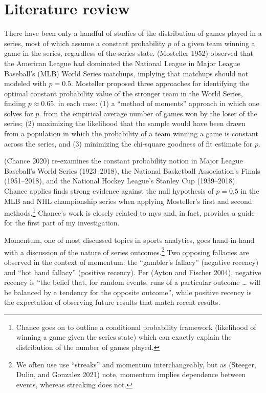 \documentclass{article}
\begin{document}
\hypertarget{literature-review}{%
\section{Literature review}\label{literature-review}}

There have been only a handful of studies of the distribution of games
played in a series, most of which assume a constant probability \(p\) of
a given team winning a game in the series, regardless of the series
state. (Mosteller 1952) observed that the American League had dominated
the National League in Major League Baseball's (MLB) World Series
matchups, implying that matchups should not modeled with \(p = 0.5\).
Mosteller proposed three approaches for identifying the optimal constant
probability value of the stronger team in the World Series, finding
\(p \approx 0.65\). in each case: (1) a ``method of moments'' approach
in which one solves for \(p\). from the empirical average number of
games won by the loser of the series; (2) maximizing the likelihood that
the sample would have been drawn from a population in which the
probability of a team winning a game is constant across the series, and
(3) minimizing the chi-square goodness of fit estimate for \(p\).

(Chance 2020) re-examines the constant probability notion in Major
League Baseball's World Series (1923--2018), the National Basketball
Association's Finals (1951--2018), and the National Hockey League's
Stanley Cup (1939--2018). Chance applies finds strong evidence against
the null hypothesis of \(p = 0.5\) in the MLB and NHL championship
series when applying Mosteller's first and second methods.\footnote{Chance
  goes on to outline a conditional probability framework (likelihood of
  winning a game given the series state) which can exactly explain the
  distribution of the number of games played.} Chance's work is closely
related to mys and, in fact, provides a guide for the first part of my
investigation.

Momentum, one of most discussed topics in sports analytics, goes
hand-in-hand with a discussion of the nature of series
outcomes.\footnote{We often use use ``streaks'' and momentum
  interchangeably, but as (Steeger, Dulin, and Gonzalez 2021) note,
  momentum implies dependence between events, whereas streaking does
  not.} Two opposing fallacies are observed in the context of momentum:
the ``gambler's fallacy'' (negative recency) and ``hot hand fallacy''
(positive recency). Per (Ayton and Fischer 2004), negative recency is
``the belief that, for random events, runs of a particular outcome
\ldots{} will be balanced by a tendency for the opposite outcome'',
while positive recency is the expectation of observing future results
that match recent results.
\end{document}
